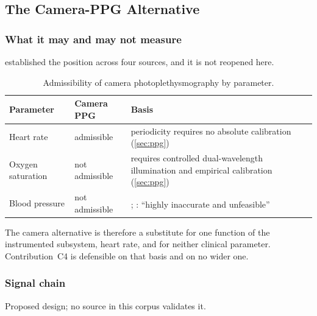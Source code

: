 \documentclass[12pt,a4paper,oneside]{report}
\newcommand{\bq}[1]{``#1''\textsuperscript{\dag}}
\begin{document}
\subsection{The Camera-PPG Alternative}\label{sec:camera-ppg}

\subsubsection{What it may and may not measure}

 established the position across four sources, and it is not reopened here.

\begin{table}[htbp]
\centering\small
\caption{Admissibility of camera photoplethysmography by parameter.}\label{tab:camera-admissibility}
\begin{tabularx}{\textwidth}{@{}>{\raggedright\arraybackslash}p{3.4cm} >{\raggedright\arraybackslash}p{2.6cm} X@{}}
\toprule
\textbf{Parameter} & \textbf{Camera PPG} & \textbf{Basis} \\
\midrule
Heart rate & admissible & periodicity requires no absolute calibration (\cref{sec:ppg}) \\
Oxygen saturation & not admissible & requires controlled dual-wavelength illumination and empirical calibration (\cref{sec:ppg}) \\
Blood pressure & not admissible & \textcite{who2023hypertension}; \textcite{alessa2019}: \bq{highly inaccurate and unfeasible} \\
\bottomrule
\end{tabularx}
\end{table}

The camera alternative is therefore a substitute for one function of the instrumented subsystem, heart rate, and for neither clinical parameter. Contribution~C4 is defensible on that basis and on no wider one.

\subsubsection{Signal chain}\label{sec:ppg-chain}

Proposed design; no source in this corpus validates it.
\end{document}
